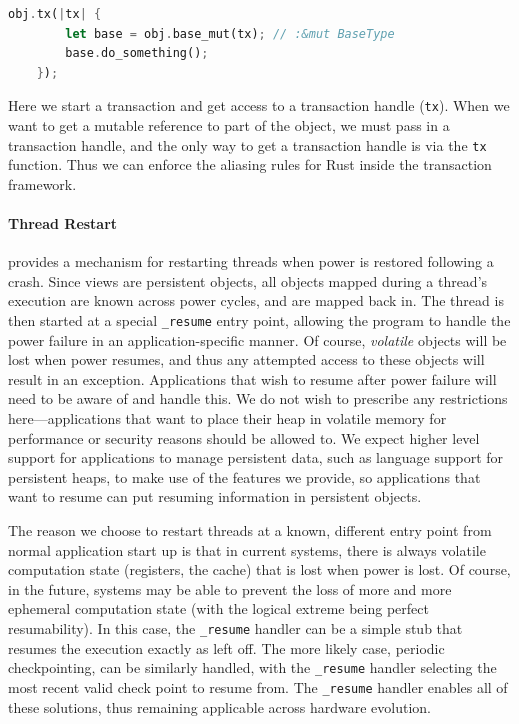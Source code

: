 \begin{lstlisting}[language=Rust]
    obj.tx(|tx| {
        let base = obj.base_mut(tx); // :&mut BaseType
        base.do_something();
    });
\end{lstlisting}

Here we start a transaction and get access to a transaction handle (\texttt{tx}). When we want to get a mutable
reference to part of the object, we must pass in a transaction handle, and the only way to get a transaction handle is
via the \texttt{tx} function. Thus we can enforce the aliasing rules for Rust inside the transaction framework.

\paragraph{Thread Restart}

\Twizzler provides a mechanism for restarting threads when power is restored following a crash.
Since views are persistent objects, all objects mapped during a thread's execution are known across
power cycles, and are mapped back in. The thread is then started at a special \texttt{\_resume}
entry point, allowing the program to handle the power failure in an application-specific manner.  Of
course, \emph{volatile} objects will be lost when power resumes, and thus any attempted access to
these objects will result in an exception. Applications that wish to resume after power failure
will need to be aware of and handle this. We do not wish to prescribe any restrictions
here---applications that want to place their heap in volatile memory for performance or security
reasons should be allowed to. We expect higher level support for applications to manage persistent
data, such as language support for persistent heaps, to make use of the features we provide, so
applications that want to resume can put resuming information in persistent objects.

The reason we choose to restart threads at a known, different entry point from normal application
start up is that in current systems, there is always volatile computation state (\eg registers, the
cache) that is lost when power is lost. Of course, in the future, systems may be able to prevent the
loss of more and more ephemeral computation state (with the logical extreme being perfect
resumability). In this case, the \texttt{\_resume} handler can be a simple stub that resumes the
execution exactly as left off. The more likely case, periodic checkpointing, can be similarly
handled, with the \texttt{\_resume} handler selecting the most recent valid check point to resume
from. The \texttt{\_resume} handler enables all of these solutions, thus remaining applicable across
hardware evolution.
